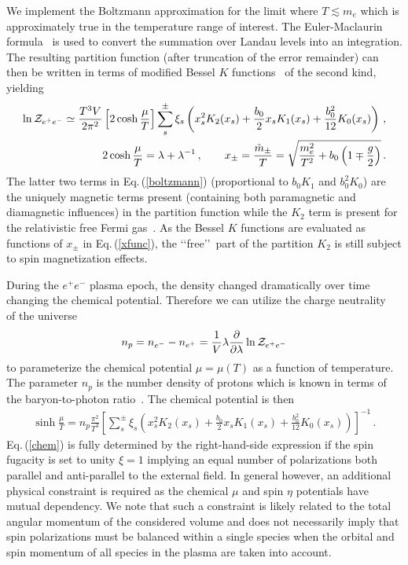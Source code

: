 \documentclass[a4paper]{article}
\newcommand{\req}[1]{Eq.\,(\ref{#1})}
\begin{document}
We implement the Boltzmann approximation for the limit where $T\lesssim m_e$ which is approximately true in the temperature range of interest. The Euler-Maclaurin formula~\cite{abramowitz1988handbook} is used to convert the summation over Landau levels into an integration. The resulting partition function (after truncation of the error remainder) can then be written in terms of modified Bessel $K$ functions~\cite{abramowitz1988handbook,letessier2002hadrons} of the second kind, yielding
\begin{align}
    \label{boltzmann}
    \ln{\cal Z}_{e^{+}e^{-}}\simeq\frac{T^{3}V}{2\pi^{2}}\left[2\cosh{\frac{\mu}{T}}\right]\sum_{s}^{\pm}\xi_{s}\left(x_{s}^{2}K_{2}(x_{s})+\frac{b_{0}}{2}x_{s}K_{1}(x_{s})+\frac{b_{0}^{2}}{12}K_{0}(x_{s})\right)\,,\\
    \label{xfunc}
    2\cosh{\frac{\mu}{T}}=\lambda+\lambda^{-1}\,,\qquad
    x_{\pm}=\frac{{\tilde m}_{\pm}}{T}=\sqrt{\frac{m_{e}^{2}}{T^{2}}+b_{0}\left(1\mp\frac{g}{2}\right)}\,.
\end{align}
The latter two terms in \req{boltzmann} (proportional to $b_{0}K_{1}$ and $b_{0}^{2}K_{0}$) are the uniquely magnetic terms present (containing both paramagnetic and diamagnetic influences) in the partition function while the $K_{2}$ term is present for the relativistic free Fermi gas~\cite{greiner2012thermodynamics}. As the Bessel $K$ functions are evaluated as functions of $x_{\pm}$ in \req{xfunc}, the \lq\lq free\rq\rq\ part of the partition $K_{2}$ is still subject to spin magnetization effects.

During the $e^{+}e^{-}$ plasma epoch, the density changed dramatically over time changing the chemical potential. Therefore we can utilize the charge neutrality~\cite{rafelski2023short,letessier2002hadrons} of the universe
\begin{align}
    \label{chargeneutrality}
    n_{p}=n_{e^{-}}-n_{e^{+}}=\frac{1}{V}\lambda\frac{\partial}{\partial\lambda}\ln{\cal Z}_{e^{+}e^{-}}
\end{align}
to parameterize the chemical potential $\mu=\mu(T)$ as a function of temperature. The parameter $n_{p}$ is the number density of protons which is known in terms of the baryon-to-photon ratio~\cite{workman2022pdg}. The chemical potential is then
\begin{align}
    \label{chem}
    \sinh{\frac{\mu}{T}}=n_{p}\frac{\pi^{2}}{T^{3}}\left[\sum_{s}^{\pm}\xi_{s}\left(x_{s}^{2}K_{2}(x_{s})+\frac{b_{0}}{2}x_{s}K_{1}(x_{s})+\frac{b_{0}^{2}}{12}K_{0}(x_{s})\right)\right]^{-1}\,.
\end{align}
\req{chem} is fully determined by the right-hand-side expression if the spin fugacity is set to unity $\xi=1$ implying an equal number of polarizations both parallel and anti-parallel to the external field. In general however, an additional physical constraint is required as the chemical $\mu$ and spin $\eta$ potentials have mutual dependency. We note that such a constraint is likely related to the total angular momentum of the considered volume and does not necessarily imply that spin polarizations must be balanced within a single species when the orbital and spin momentum of all species in the plasma are taken into account.
\end{document}
